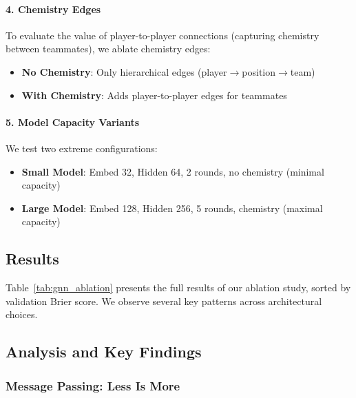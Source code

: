 \paragraph{4. Chemistry Edges}
To evaluate the value of player-to-player connections (capturing chemistry between teammates), we ablate chemistry edges:
\begin{itemize}[noitemsep]
    \item \textbf{No Chemistry}: Only hierarchical edges (player$\rightarrow$position$\rightarrow$team)
    \item \textbf{With Chemistry}: Adds player-to-player edges for teammates
\end{itemize}

\paragraph{5. Model Capacity Variants}
We test two extreme configurations:
\begin{itemize}[noitemsep]
    \item \textbf{Small Model}: Embed 32, Hidden 64, 2 rounds, no chemistry (minimal capacity)
    \item \textbf{Large Model}: Embed 128, Hidden 256, 5 rounds, chemistry (maximal capacity)
\end{itemize}

\subsection{Results}
\label{subsec:gnn_ablation_results}

Table~\ref{tab:gnn_ablation} presents the full results of our ablation study, sorted by validation Brier score. We observe several key patterns across architectural choices.



\subsection{Analysis and Key Findings}
\label{subsec:gnn_ablation_analysis}

\subsubsection{Message Passing: Less Is More}
\label{subsubsec:gnn_message_passing}

